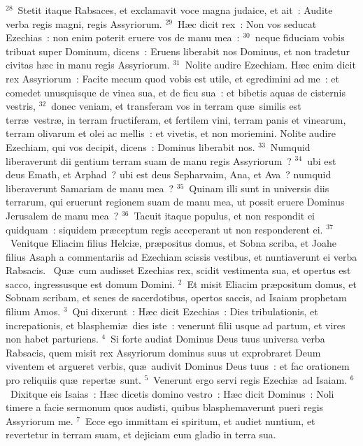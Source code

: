 ${}^{28}$~Stetit itaque Rabsaces, et exclamavit voce magna judaice, et ait~: Audite verba regis magni, regis Assyriorum.
${}^{29}$~H\ae c dicit rex~: Non vos seducat Ezechias~: non enim poterit eruere vos de manu mea~:
${}^{30}$~neque fiduciam vobis tribuat super Dominum, dicens~: Eruens liberabit nos Dominus, et non tradetur civitas h\ae c in manu regis Assyriorum.
${}^{31}$~Nolite audire Ezechiam. H\ae c enim dicit rex Assyriorum~: Facite mecum quod vobis est utile, et egredimini ad me~: et comedet unusquisque de vinea sua, et de ficu sua~: et bibetis aquas de cisternis vestris,
${}^{32}$~donec veniam, et transferam vos in terram qu\ae\ similis est terr\ae\ vestr\ae , in terram fructiferam, et fertilem vini, terram panis et vinearum, terram olivarum et olei ac mellis~: et vivetis, et non moriemini. Nolite audire Ezechiam, qui vos decipit, dicens~: Dominus liberabit nos.
${}^{33}$~Numquid liberaverunt dii gentium terram suam de manu regis Assyriorum~?
${}^{34}$~ubi est deus Emath, et Arphad~? ubi est deus Sepharvaim, Ana, et Ava~? numquid liberaverunt Samariam de manu mea~?
${}^{35}$~Quinam illi sunt in universis diis terrarum, qui eruerunt regionem suam de manu mea, ut possit eruere Dominus Jerusalem de manu mea~?
${}^{36}$~Tacuit itaque populus, et non respondit ei quidquam~: siquidem pr\ae ceptum regis acceperant ut non responderent ei.
${}^{37}$~Venitque Eliacim filius Helci\ae , pr\ae positus domus, et Sobna scriba, et Joahe filius Asaph a commentariis ad Ezechiam scissis vestibus, et nuntiaverunt ei verba Rabsacis.
~\lettrine[lines=10,image=true,loversize=0.05,lraise=-0.03]{Q}{}u\ae\ cum audisset Ezechias rex, scidit vestimenta sua, et opertus est sacco, ingressusque est domum Domini.
${}^{2}$~Et misit Eliacim pr\ae positum domus, et Sobnam scribam, et senes de sacerdotibus, opertos saccis, ad Isaiam prophetam filium Amos.
${}^{3}$~Qui dixerunt~: H\ae c dicit Ezechias~: Dies tribulationis, et increpationis, et blasphemi\ae\ dies iste~: venerunt filii usque ad partum, et vires non habet parturiens.
${}^{4}$~Si forte audiat Dominus Deus tuus universa verba Rabsacis, quem misit rex Assyriorum dominus suus ut exprobraret Deum viventem et argueret verbis, qu\ae\ audivit Dominus Deus tuus~: et fac orationem pro reliquiis qu\ae\ repert\ae\ sunt.
${}^{5}$~Venerunt ergo servi regis Ezechi\ae\ ad Isaiam.
${}^{6}$~Dixitque eis Isaias~: H\ae c dicetis domino vestro~: H\ae c dicit Dominus~: Noli timere a facie sermonum quos audisti, quibus blasphemaverunt pueri regis Assyriorum me.
${}^{7}$~Ecce ego immittam ei spiritum, et audiet nuntium, et revertetur in terram suam, et dejiciam eum gladio in terra sua.



